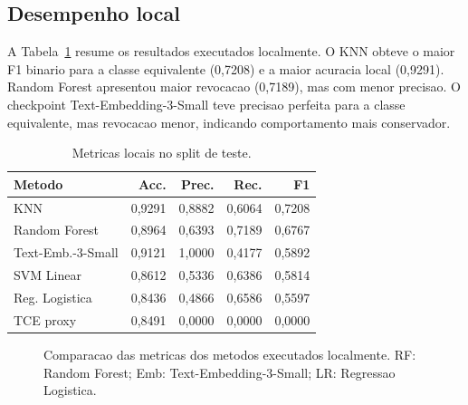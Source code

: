 \documentclass[sigconf,screen,nonacm]{acmart}
\begin{document}
\subsection{Desempenho local}

A Tabela~\ref{tab:metricas} resume os resultados executados localmente. O KNN obteve o maior F1 binario para a classe equivalente (0,7208) e a maior acuracia local (0,9291). Random Forest apresentou maior revocacao (0,7189), mas com menor precisao. O checkpoint Text-Embedding-3-Small teve precisao perfeita para a classe equivalente, mas revocacao menor, indicando comportamento mais conservador.

\begin{table}[t]
  \centering
  \caption{Metricas locais no split de teste.}
  \label{tab:metricas}
  \small
  \begin{tabular}{lrrrr}
    \toprule
    Metodo & Acc. & Prec. & Rec. & F1 \\
    \midrule
    KNN & 0,9291 & 0,8882 & 0,6064 & 0,7208 \\
    Random Forest & 0,8964 & 0,6393 & 0,7189 & 0,6767 \\
    Text-Emb.-3-Small & 0,9121 & 1,0000 & 0,4177 & 0,5892 \\
    SVM Linear & 0,8612 & 0,5336 & 0,6386 & 0,5814 \\
    Reg. Logistica & 0,8436 & 0,4866 & 0,6586 & 0,5597 \\
    TCE proxy & 0,8491 & 0,0000 & 0,0000 & 0,0000 \\
    \bottomrule
  \end{tabular}
\end{table}

\begin{figure}[t]
  \centering
  \caption{Comparacao das metricas dos metodos executados localmente. RF: Random Forest; Emb: Text-Embedding-3-Small; LR: Regressao Logistica.}
  \label{fig:metricas}
\end{figure}
\end{document}
